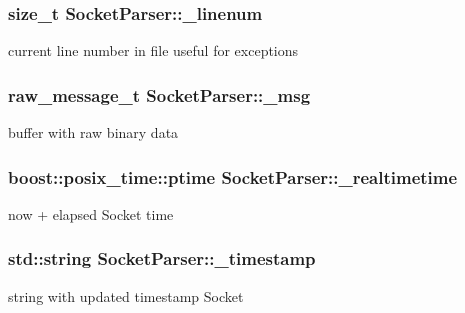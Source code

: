 \subsubsection[{\+\_\+linenum}]{\setlength{\rightskip}{0pt plus 5cm}size\+\_\+t Socket\+Parser\+::\+\_\+linenum\hspace{0.3cm}{\ttfamily [protected]}}\label{class_socket_parser_afd07458ad5df143cfe01dde2f3669272}
current line number in file useful for exceptions \hypertarget{class_socket_parser_ae24e2dee6193c39465ec0f1326d62f8a}{}
\subsubsection[{\+\_\+msg}]{\setlength{\rightskip}{0pt plus 5cm}raw\+\_\+message\+\_\+t Socket\+Parser\+::\+\_\+msg\hspace{0.3cm}{\ttfamily [protected]}}\label{class_socket_parser_ae24e2dee6193c39465ec0f1326d62f8a}
buffer with raw binary data \hypertarget{class_socket_parser_a62a7a4fab1e5fd28f03d84b50a12ad94}{}
\subsubsection[{\+\_\+realtimetime}]{\setlength{\rightskip}{0pt plus 5cm}boost\+::posix\+\_\+time\+::ptime Socket\+Parser\+::\+\_\+realtimetime\hspace{0.3cm}{\ttfamily [protected]}}\label{class_socket_parser_a62a7a4fab1e5fd28f03d84b50a12ad94}
now + elapsed Socket time \hypertarget{class_socket_parser_ab01ef675f49307a6e53230370e7087a5}{}
\subsubsection[{\+\_\+timestamp}]{\setlength{\rightskip}{0pt plus 5cm}std\+::string Socket\+Parser\+::\+\_\+timestamp\hspace{0.3cm}{\ttfamily [protected]}}\label{class_socket_parser_ab01ef675f49307a6e53230370e7087a5}
string with updated timestamp Socket \hypertarget{class_socket_parser_ace4efb971e7adbd8f3053eb06f23d0e8}{}
